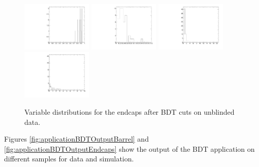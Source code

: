 \begin{figure}
  \includegraphics[width=0.3\textwidth]{Figures/AfterBDTCut_iso_EndcapsUnblinded.pdf}
  \includegraphics[width=0.3\textwidth]{Figures/AfterBDTCut_docatrk_EndcapsUnblinded.pdf}
  \includegraphics[width=0.3\textwidth]{Figures/AfterBDTCut_closetrk_EndcapsUnblinded.pdf}
  \includegraphics[width=0.3\textwidth]{Figures/AfterBDTCut_chi2dof_EndcapsUnblinded.pdf}
  \caption{Variable distributions for the endcaps after BDT cuts on unblinded data.}
  \label{fig:AfterBDTCutVariablesEndcapsUnblinded}
\end{figure}

Figures \ref{fig:applicationBDTOutputBarrel} and \ref{fig:applicationBDTOutputEndcaps} show the output of the BDT application on different samples for data and \BsMuMu simulation.

